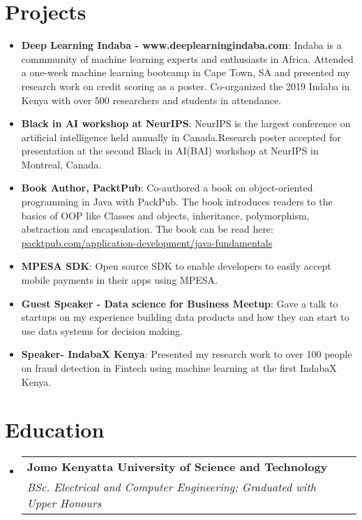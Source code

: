 \documentclass[letterpaper,11pt]{article}
\makeatletter
\newcommand{\resumeItem}[2]{
  \item\small{
    \textbf{#1}{: #2 \vspace{-2pt}}
  }
}
\newcommand{\resumeSubheading}[4]{
  \vspace{-1pt}\item
    \begin{tabular*}{0.97\textwidth}{l@{\extracolsep{\fill}}r}
      \textbf{#1} & #2 \\
      \textit{\small#3} & \textit{\small #4} \\
    \end{tabular*}\vspace{-5pt}
}
\newcommand{\resumeSubItem}[2]{\resumeItem{#1}{#2}\vspace{-4pt}}
\newcommand{\resumeSubHeadingListStart}{\begin{itemize}[leftmargin=*]}
\newcommand{\resumeSubHeadingListEnd}{\end{itemize}}
\makeatother
\begin{document}
\section{Projects}
  \resumeSubHeadingListStart
  	\resumeSubItem{Deep Learning Indaba - www.deeplearningindaba.com}
      {Indaba is a commmunity of machine learning experts and enthusiasts in Africa. Attended a one-week machine learning bootcamp in Cape Town, SA and presented my research work on credit scoring as a poster. Co-organized the 2019 Indaba in Kenya with over 500 researchers and students in attendance.}
  	\resumeSubItem{Black in AI workshop at NeurIPS}
      {NeurIPS is the largest conference on artificial intelligence held annually in Canada.Research poster accepted for presentation at the second Black in AI(BAI) workshop at NeurIPS in Montreal, Canada.}
  	\resumeSubItem{Book Author, PacktPub}
      {Co-authored a book on object-oriented programming in Java with PackPub. The book introduces readers to the basics of OOP like Classes and objects, inheritance, polymorphism, abstraction and encapsulation. The book can be read here:\href{https://www.packtpub.com/application-development/java-fundamentals}{ packtpub.com/application-development/java-fundamentals}}
    \resumeSubItem{MPESA SDK}
      {Open source SDK to enable developers to easily accept mobile payments in their apps using MPESA.}
    \resumeSubItem{Guest Speaker - Data science for Business Meetup}
      {Gave a talk to startups on my experience building data products and how they can start to use data systems for decision making.}
    \resumeSubItem{Speaker- IndabaX Kenya}
      {Presented my research work to over 100 people on fraud detection in Fintech using machine learning at the first IndabaX Kenya.}
  \resumeSubHeadingListEnd

\section{Education}
  \resumeSubHeadingListStart
    \resumeSubheading
      {Jomo Kenyatta University of Science and Technology}{}
      {BSc. Electrical and Computer Engineering; Graduated with Upper Honours}
      \
  \resumeSubHeadingListEnd

%


\end{document}
